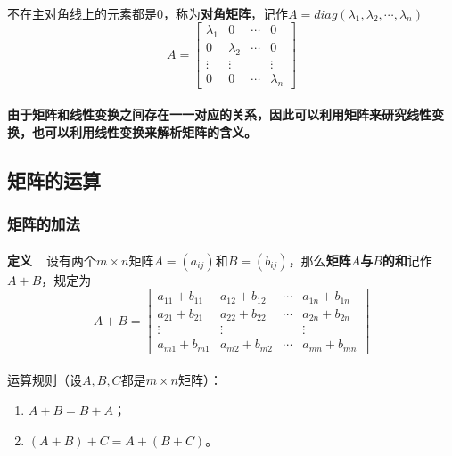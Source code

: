 \paragraph{}
不在主对角线上的元素都是$0$，称为\textbf{对角矩阵}，记作$A = diag(\lambda_1,\lambda_2,\cdots,\lambda_n)$
\begin{equation*}
  A = \left[\begin{array}{cccc}
    \lambda_1 & 0 & \cdots & 0 \\
    0 & \lambda_2 & \cdots & 0 \\
    \vdots & \vdots & & \vdots \\
    0 & 0 & \cdots & \lambda_n
  \end{array}\right]
\end{equation*}

\paragraph{}
\textbf{由于矩阵和线性变换之间存在一一对应的关系，因此可以利用矩阵来研究线性变换，也可以利用线性变换来解析矩阵的含义。}

\subsection{矩阵的运算}
\subsubsection{矩阵的加法}
\paragraph{}
\textbf{定义~~}设有两个$m\times n$矩阵$A=(a_{ij})$和$B=(b_{ij})$，那么\textbf{矩阵$A$与$B$的和}记作$A+B$，规定为
\begin{equation*}
  A+B=\left[\begin{array}{cccc}
    a_{11} + b_{11} & a_{12}+b_{12} & \cdots & a_{1n} + b_{1n} \\
    a_{21} + b_{21} & a_{22}+b_{22} & \cdots & a_{2n} + b_{2n} \\
    \vdots & \vdots &  & \vdots \\
    a_{m1} + b_{m1} & a_{m2}+b_{m2} & \cdots & a_{mn} + b_{mn}
  \end{array}\right]
\end{equation*}

\paragraph{}
运算规则（设$A, B, C$都是$m\times n$矩阵）：
\begin{enumerate}
  \item $A+B = B+A$；
  \item $(A+B)+C = A+(B+C)$。
\end{enumerate}

